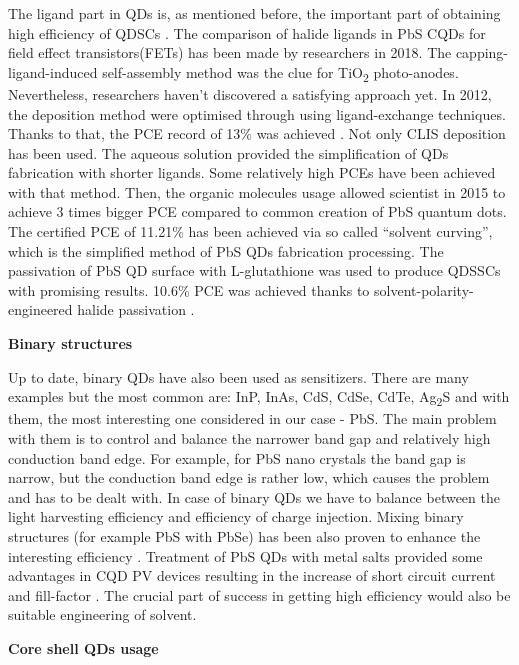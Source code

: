 \begin{enumerate}
The ligand part in QDs is, as mentioned before, the important part of obtaining high efficiency of QDSCs \cite{Shang2016}. The comparison of halide ligands in PbS CQDs for field effect transistors(FETs) has been made by researchers in 2018\cite{Balazs2018}. The capping-ligand-induced self-assembly method was the clue for TiO\textsubscript{2} photo-anodes\cite{HuashangRao2018}. Nevertheless, researchers haven't discovered a satisfying approach yet. In 2012, the deposition method were optimised through using ligand-exchange techniques.\cite{Cheng2012} Thanks to that, the PCE record of 13\% was achieved \cite{W.Feng2018} . Not only CLIS deposition has been used. The aqueous solution provided the simplification of QDs fabrication with shorter ligands. Some relatively high PCEs have been achieved with that method. Then, the organic  molecules usage allowed scientist in 2015 to achieve 3 times bigger PCE compared to common creation of PbS quantum dots.\cite{Infante2015} The certified PCE of 11.21\% has been achieved via so called ``solvent curving'', which is the simplified method of PbS QDs fabrication processing. The passivation of PbS QD surface with
L-glutathione was used to produce QDSSCs with promising results.\cite{Cordes2016} 10.6\% PCE was achieved thanks to solvent-polarity-engineered halide passivation \cite{OleksandrVoznyy2016} .

\textbf{Binary structures}

Up to date, binary QDs have also been used as sensitizers. There are
many examples but the most common are: InP, InAs, CdS, CdSe, CdTe,
Ag\textsubscript{2}S and with them, the most interesting one considered
in our case - PbS.\cite{P.Zhao2015} \cite{Y.Yu2008} The main problem with
them is to control and balance the narrower band gap and relatively high
conduction band edge. For example, for PbS nano crystals the band gap is
narrow, but the conduction band edge is rather low, which causes the
problem and has to be dealt with. In case of binary QDs we have to
balance between the light harvesting efficiency and efficiency of charge
injection. Mixing binary structures (for example PbS with PbSe) has been
also proven to enhance the interesting efficiency\cite{ShujuanHuangb22019} \cite{Fan}. Treatment of PbS QDs with metal salts provided some advantages in CQD PV devices resulting in the increase of short circuit current and fill-factor \cite{Maurano2016} .
The crucial part of success in getting high efficiency would also be
suitable engineering of solvent\cite{YuehuaYang2017}.

\textbf{Core shell QDs usage}


\end{enumerate}
